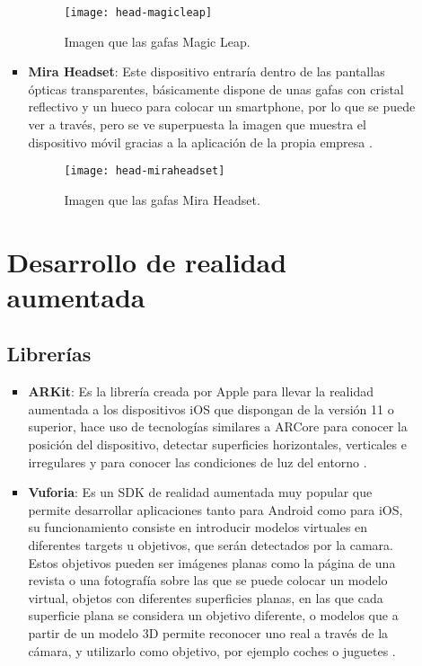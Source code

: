 \begin{itemize}
\begin{itemize}
\begin{itemize}
  \begin{figure}[h]
    \centering
    \texttt{[image: head-magicleap]}
    \caption{Imagen que las gafas Magic Leap.\protect\footnotemark}
    \label{figura-magicleap}
  \end{figure}


  \item \textbf{Mira Headset}: Este dispositivo entraría dentro de las pantallas ópticas transparentes, básicamente dispone de unas gafas con cristal reflectivo y un hueco para colocar un smartphone, por lo que se puede ver a través, pero se ve superpuesta la imagen que muestra el dispositivo móvil gracias a la aplicación de la propia empresa \cite{mira-ar}.

  \begin{figure}[h]
    \centering
    \texttt{[image: head-miraheadset]}
    \caption{Imagen que las gafas Mira Headset.\protect\footnotemark}
    \label{figura-miraheadset}
  \end{figure}


\end{itemize}

\section{Desarrollo de realidad aumentada}

\subsection{Librerías}
\begin{itemize}
  \item \textbf{ARKit}: Es la librería creada por Apple para llevar la realidad aumentada a los dispositivos iOS que dispongan de la versión 11 o superior, hace uso de tecnologías similares a ARCore para conocer la posición del dispositivo, detectar superficies horizontales, verticales e irregulares y para conocer las condiciones de luz del entorno \cite{arkit}.

  \item \textbf{Vuforia}: Es un SDK de realidad aumentada muy popular que permite desarrollar aplicaciones tanto para Android como para iOS, su funcionamiento consiste en introducir modelos virtuales en diferentes targets u objetivos, que serán detectados por la camara. Estos objetivos pueden ser imágenes planas como la página de una revista o una fotografía sobre las que se puede colocar un modelo virtual, objetos con diferentes superficies planas, en las que cada superficie plana se considera un objetivo diferente, o modelos que a partir de un modelo 3D permite reconocer uno real a través de la cámara, y utilizarlo como objetivo, por ejemplo coches o juguetes \cite{vuforia}.


\end{itemize}
\end{itemize}
\end{itemize}
